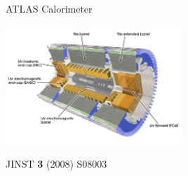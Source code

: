 \documentclass[11pt, xcolor={dvipsnames}, aspectratio=169, notes]{beamer}
\begin{document}

\begin{frame}{ATLAS Calorimeter}
  \centering\footnotesize

  \includegraphics[width=0.5\textwidth]{atlas/atlas_calo}

  JINST \textbf{3} (2008) S08003
\end{frame}

\end{document}
